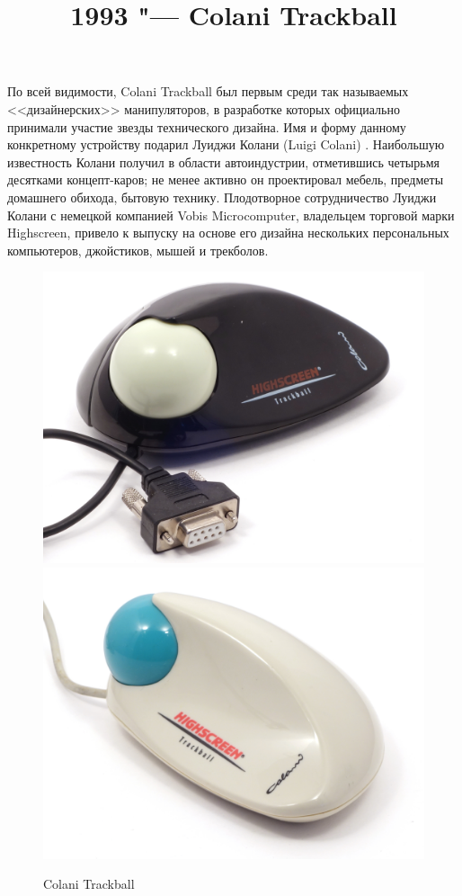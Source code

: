 \documentclass[11pt, a4paper]{article}
\begin{document}
\title{1993 "--- Colani Trackball}
\date{}
\maketitle

По всей видимости, Colani Trackball был первым среди так называемых <<дизайнерских>> манипуляторов, в разработке которых официально принимали участие звезды технического дизайна. Имя и форму данному конкретному устройству подарил Луиджи Колани (Luigi Colani) \cite{wiki}. Наибольшую известность Колани получил в области автоиндустрии, отметившись четырьмя десятками концепт-каров; не менее активно он проектировал мебель, предметы домашнего обихода, бытовую технику. Плодотворное сотрудничество Луиджи Колани с немецкой компанией Vobis Microcomputer, владельцем торговой марки Highscreen, привело к выпуску на основе его дизайна нескольких персональных компьютеров, джойстиков, мышей и трекболов.

\begin{figure}[h]
    \centering
    \includegraphics[scale=0.46]{1993_colani_trackball/pic_b_60.jpg}
    \includegraphics[scale=0.46]{1993_colani_trackball/pic_w_60.jpg}
    \caption{Colani Trackball}
    \label{fig:ColaniPic}
\end{figure}
\end{document}
